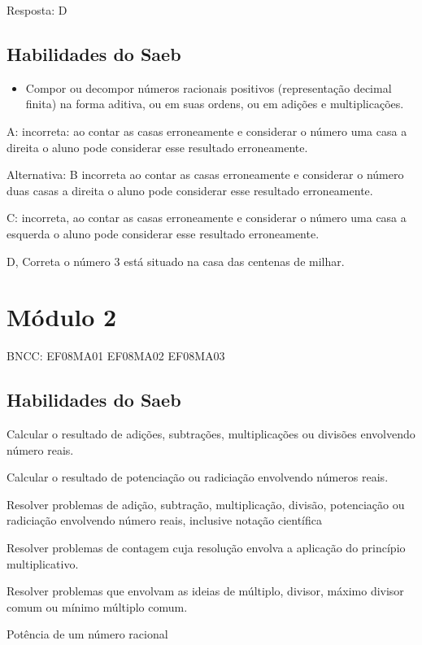 Resposta: D

\section{Habilidades do Saeb}

\begin{itemize}
\item 
  Compor ou decompor números racionais positivos (representação decimal
  finita) na forma aditiva, ou em suas ordens, ou em adições e
  multiplicações.
\end{itemize}

A: incorreta: ao contar as casas erroneamente e considerar o número uma
casa a direita o aluno pode considerar esse resultado erroneamente.

Alternativa: B incorreta ao contar as casas erroneamente e considerar o
número duas casas a direita o aluno pode considerar esse resultado
erroneamente.

C: incorreta, ao contar as casas erroneamente e considerar o número uma
casa a esquerda o aluno pode considerar esse resultado erroneamente.

D, Correta o número 3 está situado na casa das centenas de milhar.

\chapter{Módulo 2}

BNCC: EF08MA01 EF08MA02 EF08MA03

\section{Habilidades do Saeb}

Calcular o resultado de adições, subtrações, multiplicações ou divisões
envolvendo número reais.

Calcular o resultado de potenciação ou radiciação envolvendo números
reais.

Resolver problemas de adição, subtração, multiplicação, divisão,
potenciação ou radiciação envolvendo número reais, inclusive notação
científica

Resolver problemas de contagem cuja resolução envolva a aplicação do
princípio multiplicativo.

Resolver problemas que envolvam as ideias de múltiplo, divisor, máximo
divisor comum ou mínimo múltiplo comum.

Potência de um número racional

